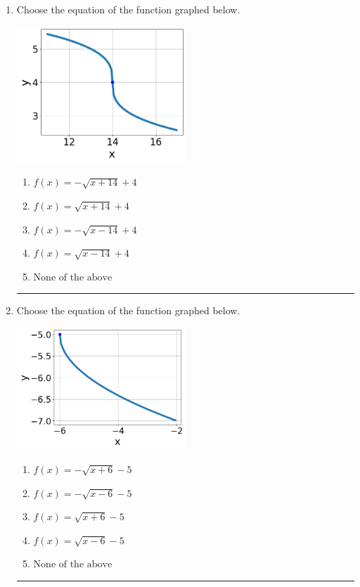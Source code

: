 \documentclass[14pt]{extbook}
\newcommand{\litem}[1]{\item#1\hspace*{-1cm}\rule{\textwidth}{0.4pt}}
\begin{document}
\begin{enumerate}
\litem{
Choose the equation of the function graphed below.
\begin{center}
    \includegraphics[width=0.5\textwidth]{../Figures/radicalGraphToEquationA.png}
\end{center}
\begin{enumerate}[label=\Alph*.]
\item \( f(x) = - \sqrt{x + 14} + 4 \)
\item \( f(x) = \sqrt{x + 14} + 4 \)
\item \( f(x) = - \sqrt{x - 14} + 4 \)
\item \( f(x) = \sqrt{x - 14} + 4 \)
\item \( \text{None of the above} \)

\end{enumerate} }
\litem{
Choose the equation of the function graphed below.
\begin{center}
    \includegraphics[width=0.5\textwidth]{../Figures/radicalGraphToEquationCopyA.png}
\end{center}
\begin{enumerate}[label=\Alph*.]
\item \( f(x) = - \sqrt{x + 6} - 5 \)
\item \( f(x) = - \sqrt{x - 6} - 5 \)
\item \( f(x) = \sqrt{x + 6} - 5 \)
\item \( f(x) = \sqrt{x - 6} - 5 \)
\item \( \text{None of the above} \)


\end{enumerate}}
\end{enumerate}
\end{document}
